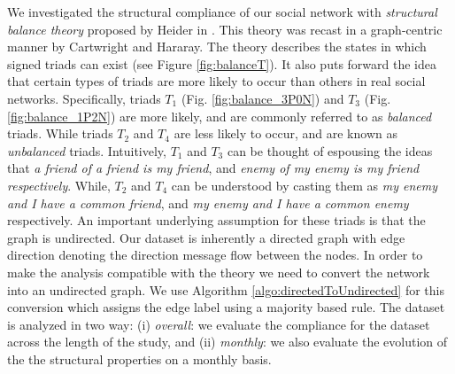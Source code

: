 We investigated the structural compliance of our social network with \textit{structural balance theory} proposed by Heider in \cite{heider1946attitudes}. 
This theory was recast in a graph-centric manner by Cartwright and Hararay\cite{cartwright1956structural}. 
The theory describes the states in which signed triads can exist (see Figure \ref{fig:balanceT}). 
It also puts forward the idea that certain types of triads are more likely to occur than others in real social networks. 
Specifically, triads $T_1$ (Fig. \ref{fig:balance_3P0N}) and $T_3$ (Fig. \ref{fig:balance_1P2N}) are more likely, and are commonly referred to as \textit{balanced} triads. 
While triads $T_2$ and $T_4$ are less likely to occur, and are known as \textit{unbalanced} triads. 
Intuitively, $T_1$ and $T_3$ can be thought of espousing the ideas that \emph{a friend of a friend is my friend}, and \emph{enemy of my enemy is my friend respectively}. 
While, $T_2$ and $T_4$ can be understood by casting them as \emph{my enemy and I have a common friend}, and \emph{my enemy and I have a common enemy} respectively. 
An important underlying assumption for these triads is that the graph is undirected. 
Our dataset is inherently a directed graph with edge direction denoting the direction message flow between the nodes.
In order to make the analysis compatible with the theory we need to convert the network into an undirected graph. 
We use Algorithm \ref{algo:directedToUndirected} for this conversion which assigns the edge label using a majority based rule. 
The dataset is analyzed in two way: (i) \emph{overall}: we evaluate the compliance for the dataset across the length of the study, and (ii) \emph{monthly}: we also evaluate the evolution of the the structural properties on a monthly basis.

